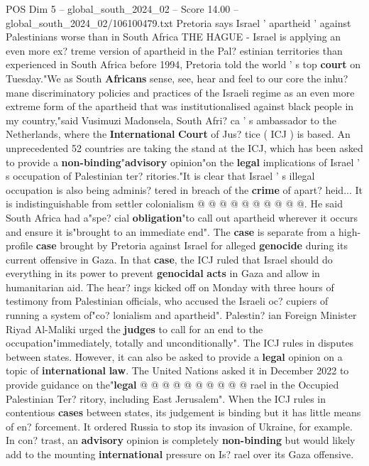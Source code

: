 \begin{textsample}{POS Dim 5 – global\_south\_2024\_02 – Score 14.00 – global\_south\_2024\_02/106100479.txt}  \label{ex:f5_pos_157}
Pretoria says Israel ' apartheid ' against Palestinians worse than in South Africa THE HAGUE - Israel is applying an even more ex? treme version of apartheid in the Pal? estinian territories than experienced in South Africa before 1994, Pretoria told the world ' s top \textbf{court} on Tuesday."We as South \textbf{Africans} sense, see, hear and feel to our core the inhu? mane discriminatory policies and practices of the Israeli regime as an even more extreme form of the apartheid that was institutionalised against black people in my country,"said Vusimuzi Madonsela, South Afri? ca ' s ambassador to the Netherlands, where the \textbf{International} \textbf{Court} of Jus? tice ( ICJ ) is based.
An unprecedented 52 countries are taking the stand at the ICJ, which has been asked to provide a \textbf{non-binding}"\textbf{advisory} opinion"on the \textbf{legal} implications of Israel ' s occupation of Palestinian ter? ritories."It is clear that Israel ' s illegal occupation is also being adminis? tered in breach of the \textbf{crime} of apart? heid...
It is indistinguishable from settler colonialism @ @ @ @ @ @ @ @ @ @.
He said South Africa had a"spe? cial \textbf{obligation}"to call out apartheid wherever it occurs and ensure it is"brought to an immediate end".
The \textbf{case} is separate from a high-profile \textbf{case} brought by Pretoria against Israel for alleged \textbf{genocide} during its current offensive in Gaza.
In that \textbf{case}, the ICJ ruled that Israel should do everything in its power to prevent \textbf{genocidal} \textbf{acts} in Gaza and allow in humanitarian aid.
The hear? ings kicked off on Monday with three hours of testimony from Palestinian officials, who accused the Israeli oc? cupiers of running a system of"co? lonialism and apartheid".
Palestin? ian Foreign Minister Riyad Al-Maliki urged the \textbf{judges} to call for an end to the occupation"immediately, totally and unconditionally".
The ICJ rules in disputes between states.
However, it can also be asked to provide a \textbf{legal} opinion on a topic of \textbf{international} \textbf{law}.
The United Nations asked it in December 2022 to provide guidance on the"\textbf{legal} @ @ @ @ @ @ @ @ @ @ rael in the Occupied Palestinian Ter? ritory, including East Jerusalem".
When the ICJ rules in contentious \textbf{cases} between states, its judgement is binding but it has little means of en? forcement.
It ordered Russia to stop its invasion of Ukraine, for example.
In con? trast, an \textbf{advisory} opinion is completely \textbf{non-binding} but would likely add to the mounting \textbf{international} pressure on Is? rael over its Gaza offensive.

\end{textsample}
